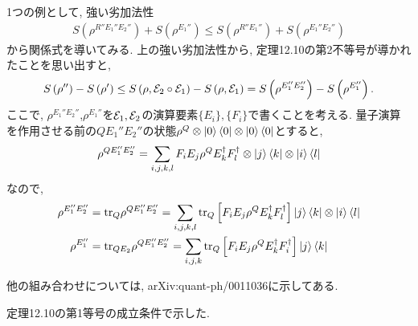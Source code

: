 \begin{ex}
    \label{ex12.15}
    1つの例として, 強い劣加法性
    \begin{align*}
        S\left( \rho^{R'' E_1'' E_2''}\right) + S\left( \rho^{E_1''}\right)
        \le S\left( \rho^{R'' E_1''}\right) + S\left( \rho^{E_1'' E_2''}\right)
    \end{align*}
    から関係式を導いてみる.
    上の強い劣加法性から, 定理12.10の第2不等号が導かれたことを思い出すと,
    \begin{align*}
        S\left(\rho''\right) - S\left(\rho'\right)
        \le
        S\left( \rho, \mathcal{E}_2 \circ \mathcal{E}_1\right)
        -
        S\left( \rho, \mathcal{E}_1\right)
        =
        S\left( \rho^{E_1'' E_2''} \right) - S\left( \rho^{E_1''}\right).
    \end{align*}
    ここで, $\rho^{E_1'' E_2''}$,$\rho^{E_1''}$を$\mathcal{E}_1, \mathcal{E}_2$の演算要素$\{ E_i \}, \{ F_i\}$で書くことを考える. 量子演算を作用させる前の$QE_1'' E_2''$の状態$\rho^Q \otimes \ket{0}\bra{0} \otimes \ket{0}\bra{0}$とすると,
    \begin{align*}
        \rho^{Q E_1'' E_2''}
        =
        \sum_{i,j,k,l}  F_i E_j \rho^Q E_k^\dagger F_l^\dagger \otimes \ket{j} \bra{k} \otimes \ket{i}\bra{l}
    \end{align*}
    なので,
    \begin{align*}
        \rho^{E_1'' E_2''}
         & = \mathrm{tr}_Q \rho^{Q E_1'' E_2''}
        = \sum_{i,j,k,l}  \mathrm{tr}_Q \left[ F_i E_j \rho^Q E_k^\dagger F_l^\dagger \right] \ket{j} \bra{k} \otimes \ket{i}\bra{l}
        \\
        \rho^{E_1'' }
         & = \mathrm{tr}_{Q E_2} \rho^{Q E_1'' E_2''}
        =\sum_{i,j,k}  \mathrm{tr}_Q \left[ F_i E_j \rho^Q E_k^\dagger F_i^\dagger \right] \ket{j} \bra{k}
    \end{align*}
    \par
    他の組み合わせについては, arXiv:quant-ph/0011036に示してある.
    \par
\end{ex}

\begin{ex}
    \label{ex12.16}
    定理12.10の第1等号の成立条件で示した.
\end{ex}


